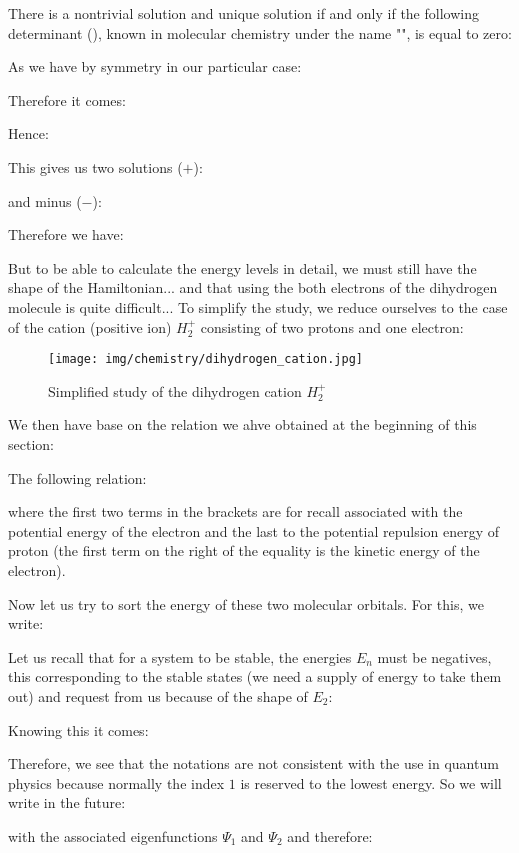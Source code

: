 	There is a nontrivial solution and unique solution if and only if the following determinant (), known in molecular chemistry under the name "", is equal to zero:
	
	As we have by symmetry in our particular case:
	
	Therefore it comes:
	
	Hence:
	
	This gives us two solutions ($+$):
	
	and minus ($-$):
	
	Therefore we have:	
	
	But to be able to calculate the energy levels in detail, we must still have the shape of the Hamiltonian... and that using the both electrons of the dihydrogen molecule is quite difficult... To simplify the study, we reduce ourselves to the case of the cation (positive ion) $H_2^{+}$ consisting of two protons and one electron:
	\begin{figure}[H]
		\begin{center}
		\texttt{[image: img/chemistry/dihydrogen\_cation.jpg]}
		\end{center}	
		\caption{Simplified study of the dihydrogen cation $H_2^+$}
	\end{figure}
	We then have base on the relation we ahve obtained at the beginning of this section:
	
	The following relation:
	
	where the first two terms in the brackets are for recall associated with the potential energy of the electron and the last to the potential repulsion energy of proton (the first term on the right of the equality is the kinetic energy of the electron).

	Now let us try to sort the energy of these two molecular orbitals. For this, we write:
	
	Let us recall that for a system to be stable, the energies  $E_n$ must be negatives, this corresponding to the stable states (we need a supply of energy to take them out) and request from us because of the shape of $E_2$:
	
	Knowing this it comes:
	
	Therefore, we see that the notations are not consistent with the use in quantum physics because normally the index $1$ is reserved to the lowest energy. So we will write in the future:
	
	with the associated eigenfunctions  $\Psi_1$ and $\Psi_2$ and therefore:
	
